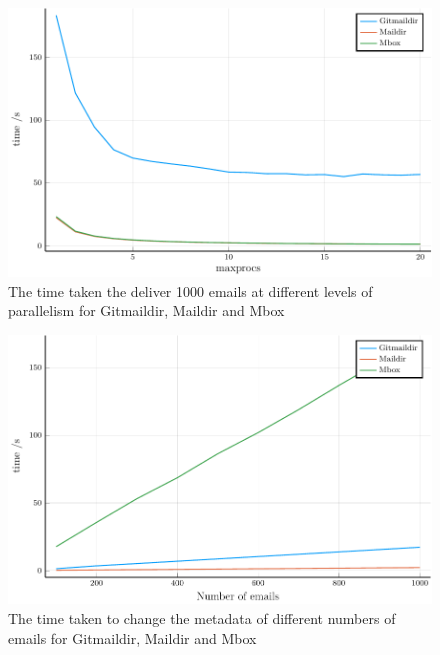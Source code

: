 \begin{figure}[h]
    \centering
    \includegraphics{figs/tdpp_combined}
    \caption{The time taken the deliver 1000 emails at different levels of parallelism for Gitmaildir, Maildir and Mbox}
    \label{fig:tdpp_combined}
\end{figure}

\begin{figure}[h]
    \centering
    \includegraphics{figs/tmp_combined}
    \caption{The time taken to change the metadata of different numbers of emails for Gitmaildir, Maildir and Mbox}
    \label{fig:tmp_combined}
\end{figure}

